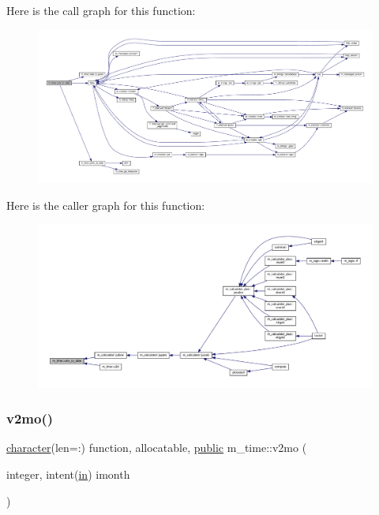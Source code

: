 \begin{DoxyVerb}
Here is the call graph for this function\+:
\nopagebreak
\begin{figure}[H]
\begin{center}
\leavevmode
\includegraphics[width=350pt]{namespacem__time_acc62ada23f8fa2fe67b428702fbcbf1c_cgraph}
\end{center}
\end{figure}
Here is the caller graph for this function\+:
\nopagebreak
\begin{figure}[H]
\begin{center}
\leavevmode
\includegraphics[width=350pt]{namespacem__time_acc62ada23f8fa2fe67b428702fbcbf1c_icgraph}
\end{center}
\end{figure}
\mbox{\label{namespacem__time_a6f28cf00e4998bb50bb503f5e4bd3f77}} 
\subsubsection{\texorpdfstring{v2mo()}{v2mo()}}
{\footnotesize\ttfamily \hyperlink{option__stopwatch_83_8txt_abd4b21fbbd175834027b5224bfe97e66}{character}(len=\+:) function, allocatable, \hyperlink{M__stopwatch_83_8txt_a2f74811300c361e53b430611a7d1769f}{public} m\+\_\+time\+::v2mo (\begin{DoxyParamCaption}\item[{integer, intent(\hyperlink{M__journal_83_8txt_afce72651d1eed785a2132bee863b2f38}{in})}]{imonth }\end{DoxyParamCaption})}




\end{DoxyVerb}
